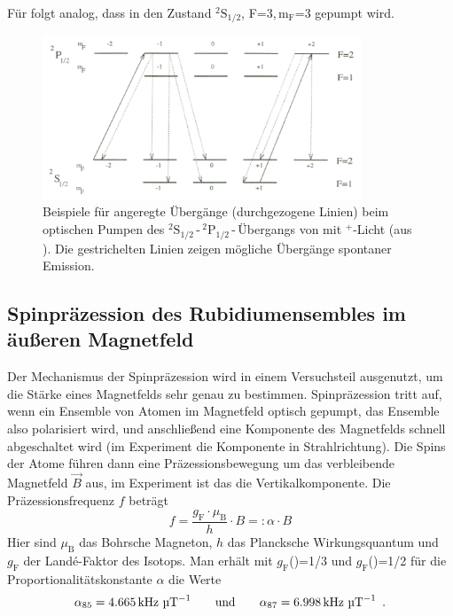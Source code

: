 Für  folgt analog, dass in den Zustand ${}^2\text{S}_{1/2}$, F=3,\,$\text{m}_\text{F}$=3 gepumpt wird. 


\begin{figure}[H]
\begin{center}
  \includegraphics[width=0.85\textwidth]{../img/optPumpen.png}
  \caption{Beispiele für angeregte Übergänge (durchgezogene Linien) beim optischen Pumpen des ${}^2\text{S}_{1/2}$\,-\,${}^2\text{P}_{1/2}$\,-\,Übergangs
  von  mit \textsigma$^+$-Licht (aus \cite{staatsex}).
  Die gestrichelten Linien zeigen mögliche Übergänge spontaner Emission.}
  \label{img:gr:optpump}
\end{center}
\end{figure} 

\subsection{Spinpräzession des Rubidiumensembles im äußeren Magnetfeld}
Der Mechanismus der Spinpräzession wird in einem Versuchsteil ausgenutzt,
um die Stärke eines Magnetfelds sehr genau zu bestimmen.
Spinpräzession tritt auf, wenn ein Ensemble von Atomen im Magnetfeld optisch gepumpt,
das Ensemble also polarisiert wird, und anschließend eine Komponente
des Magnetfelds schnell abgeschaltet wird (im Experiment die Komponente in Strahlrichtung).
Die Spins der Atome führen dann eine Präzessionsbewegung um das verbleibende Magnetfeld $\vec{B}$ aus,
im Experiment ist das die Vertikalkomponente.
Die Präzessionsfrequenz $f$ beträgt \cite{staatsex}
\begin{equation}
    \label{eq:gr:spinpräz}
    f=\frac{g_\text{F} \cdot \mu_\text{B}}{h} \cdot B=: \alpha \cdot B
\end{equation}
Hier sind $\mu_\text{B}$ das Bohrsche Magneton, $h$ das Plancksche Wirkungsquantum und
$g_\text{F}$ der Landé-Faktor des Isotops.
Man erhält mit $g_\text{F}$()=1/3 und $g_\text{F}$()=1/2 \cite{staatsex} für
die Proportionalitätskonstante $\alpha$ die Werte
\begin{equation}
    \label{eq:gr:alpha}
    \alpha_{85}=4.665\,\text{kHz } \text{\textmu T}^{-1} \qquad \text{und} \qquad	\alpha_{87}=6.998\,\text{kHz } \text{\textmu T}^{-1} \ \, .
\end{equation}

